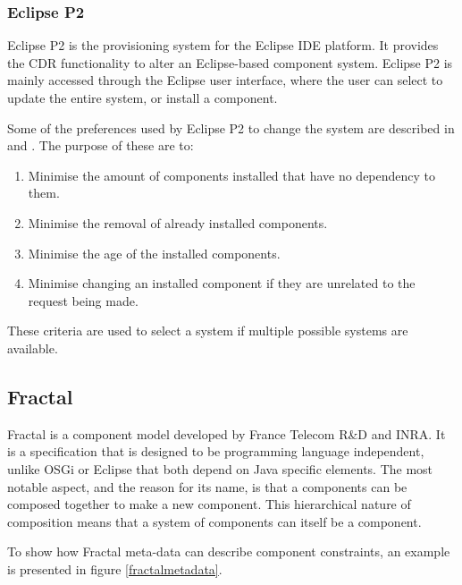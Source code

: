 \subsubsection{Eclipse P2}
Eclipse P2 \citep{le_berre_dependency_2009,leBerre2010} is the provisioning system for the Eclipse IDE platform.
It provides the CDR functionality to alter an Eclipse-based component system. 
Eclipse P2 is mainly accessed through the Eclipse user interface, where the user can select to update the entire system, or install a component.

Some of the preferences used by Eclipse P2 to change the system are described in \citep{le_berre_dependency_2009} and \citep{leBerre2010}.
The purpose of these are to:
\begin{enumerate}
  \item Minimise the amount of components installed that have no dependency to them. 
  \item Minimise the removal of already installed components.
  \item Minimise the age of the installed components.
  \item Minimise changing an installed component if they are unrelated to the request being made.
\end{enumerate} 

These criteria are used to select a system if multiple possible systems are available. 

\subsection{Fractal}
Fractal \citep{Quma2006} is a component model developed by France Telecom R\&D and INRA.
It is a specification that is designed to be programming language independent, unlike OSGi or Eclipse that both depend on Java specific elements.
The most notable aspect, and the reason for its name, is that a components can be composed together to make a new component.
This hierarchical nature of composition means that a system of components can itself be a component.

To show how Fractal meta-data can describe component constraints, an example is presented in figure \ref{fractalmetadata}.

